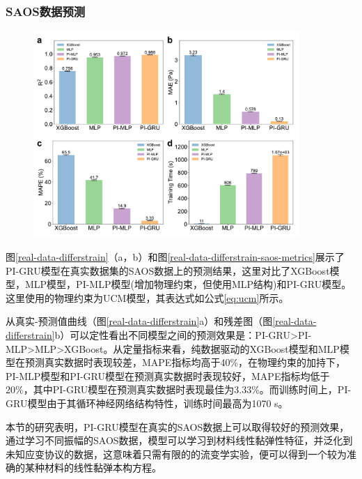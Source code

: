 \subsubsection{SAOS数据预测}
\begin{figure}
  \centering
  \includegraphics[width=0.9\textwidth]{Fig/real-data-differstrain-saos-metrics.pdf}
\end{figure}

图\ref{real-data-differstrain}（a，b）和图\ref{real-data-differstrain-saos-metrics}展示了PI-GRU模型在真实数据集的SAOS数据上的预测结果，这里对比了XGBoost模型，MLP模型，PI-MLP模型(增加物理约束，但使用MLP结构)和PI-GRU模型。
这里使用的物理约束为UCM模型，其表达式如公式\ref{eq:ucm}所示。

从真实-预测值曲线（图\ref{real-data-differstrain}a）和残差图（图\ref{real-data-differstrain}b）可以定性看出不同模型之间的预测效果是：PI-GRU>PI-MLP>MLP>XGBoost。从定量指标来看，纯数据驱动的XGBoost模型和MLP模型在预测真实数据时表现较差，MAPE指标均高于40\%，在物理约束的加持下，PI-MLP模型和PI-GRU模型在预测真实数据时表现较好，MAPE指标均低于20\%，其中PI-GRU模型在预测真实数据时表现最佳为3.33\%。而训练时间上，PI-GRU模型由于其循环神经网络结构特性，训练时间最高为1070 s。

本节的研究表明，PI-GRU模型在真实的SAOS数据上可以取得较好的预测效果，通过学习不同振幅的SAOS数据，模型可以学习到材料线性黏弹性特征，并泛化到未知应变协议的数据，这意味着只需有限的的流变学实验，便可以得到一个较为准确的某种材料的线性黏弹本构方程。

